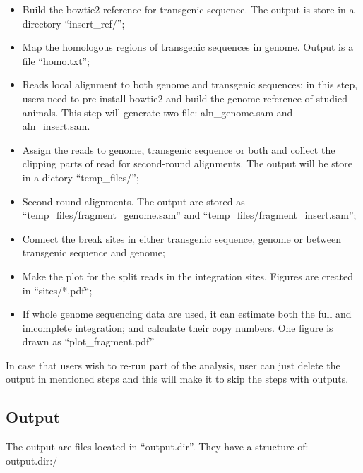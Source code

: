 \documentclass[]{article}
\begin{document}
\begin{itemize}
\item
  Build the bowtie2 reference for transgenic sequence. The output is
  store in a directory ``insert\_ref/'';
\item
  Map the homologous regions of transgenic sequences in genome. Output
  is a file ``homo.txt'';
\item
  Reads local alignment to both genome and transgenic sequences: in this
  step, users need to pre-install bowtie2 and build the genome reference
  of studied animals. This step will generate two file: aln\_genome.sam
  and aln\_insert.sam.
\item
  Assign the reads to genome, transgenic sequence or both and collect
  the clipping parts of read for second-round alignments. The output
  will be store in a dictory ``temp\_files/'';
\item
  Second-round alignments. The output are stored as
  ``temp\_files/fragment\_genome.sam'' and
  ``temp\_files/fragment\_insert.sam'';
\item
  Connect the break sites in either transgenic sequence, genome or
  between transgenic sequence and genome;
\item
  Make the plot for the split reads in the integration sites. Figures
  are created in ``sites/*.pdf``;
\item
  If whole genome sequencing data are used, it can estimate both the
  full and imcomplete integration; and calculate their copy numbers. One
  figure is drawn as ``plot\_fragment.pdf''
\end{itemize}

In case that users wish to re-run part of the analysis, user can
just delete the output in mentioned steps and this will make it to skip
the steps with outputs.

\subsection{Output}\label{output}

The output are files located in ``output.dir''. They have a structure
of: output.dir:/
\end{document}
